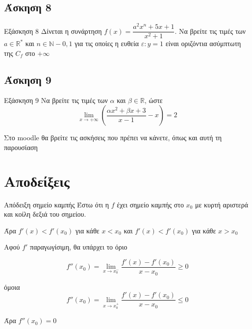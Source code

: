 \documentclass[greek]{beamer}
\begin{document}
\subsection{Άσκηση 8}
\begin{frame}[label=Άσκηση8,t]{Εξάσκηση 8}
    Δίνεται η συνάρτηση $f(x)=\dfrac{a^2x^n+5x+1}{x^2+1}$. Να βρείτε τις τιμές των $a\in\mathbb{R}^*$ και $n\in\mathbb{N}-{0,1}$ για τις οποίες η ευθεία $ε:y=1$ είναι οριζόντια ασύμπτωτη της $C_f$ στο $+\infty$

\end{frame}

\subsection{Άσκηση 9}
\begin{frame}[label=Άσκηση9,t]{Εξάσκηση 9}
    Να βρείτε τις τιμές των $α$ και $β\in\mathbb{R}$, ώστε
    $$\lim\limits_{x \to +\infty}{ \left(   \dfrac{αx^2+βx+3}{x-1}-x \right)}=2$$

\end{frame}

\begin{frame}
    Στο moodle θα βρείτε τις ασκήσεις που πρέπει να κάνετε, όπως και αυτή τη παρουσίαση
\end{frame}


\appendix

\section{Αποδείξεις}
\begin{frame}[label=Απόδειξη1]{Απόδειξη σημείο καμπής}
     Έστω ότι η $f$ έχει σημείο καμπής στο $x_0$ με κυρτή αριστερά και κοίλη δεξιά του σημείου.

    Άρα $f'(x)< f'(x_0)$ για κάθε $x<x_0$ και $f'(x)<f'(x_0)$ για κάθε $x>x_0$

     Αφού $f'$ παραγωγίσιμη, θα υπάρχει το όριο

    $$f''(x_0)=\lim\limits_{x \to x_0^-}{ \dfrac{f'(x)-f'(x_0)}{x-x_0} }\ge 0$$

     όμοια
    $$f''(x_0)=\lim\limits_{x \to x_0^+}{ \dfrac{f'(x)-f'(x_0)}{x-x_0} } \le 0$$

     Άρα $f''(x_0)=0$ \hyperlink{Θεώρημα1}{}
\end{frame}
\end{document}
